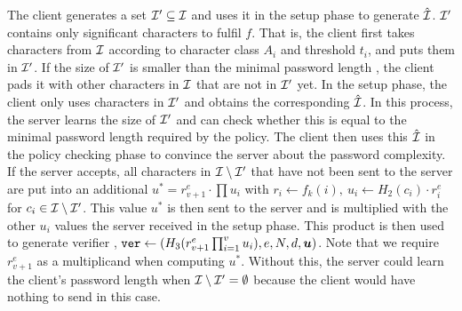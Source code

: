 The client generates a set $\mathcal{I}'\subseteq\mathcal{I}$ and uses it in the setup phase to generate $\hat{\mathcal{I}}$. 
$\mathcal{I}'$ contains only significant characters to fulfil $f$. 
That is, the client first takes characters from $\mathcal{I}$ according to character class $A_i$ and threshold $t_i$, and puts them in $\mathcal{I}'$.
If the size of $\mathcal{I}'$ is smaller than the minimal password length \pmin, the client pads it with other characters in $\mathcal{I}$ that are not in $\mathcal{I}'$ yet. 
In the setup phase, the client only uses characters in $\mathcal{I}'$ and obtains the corresponding $\hat{\mathcal{I}}$. In this process, the server learns the size of $\mathcal{I}'$ and can check whether this is equal to the minimal password length \pmin required by the policy. 
The client then uses this $\hat{\mathcal{I}}$ in the policy checking phase to convince the server about the password complexity. 
If the server accepts, all characters in $\mathcal{I}\setminus\mathcal{I}'$ that have not been sent to the server are put into an additional $u^\ast=r_{v+1}^e\cdot\prod u_i$ with $r_i\gets f_k(i),~ u_i\gets H_2(c_i)\cdot r_i^e$ for $c_i\in\mathcal{I}\setminus\mathcal{I}'$. 
This value $u^\ast$ is then sent to the server and is multiplied with the other $u_i$ values the server received in the setup phase.
This product is then used to generate verifier \ver, \ie $\mathtt{ver}\gets(H_3(r_{v+1}^e\prod_{i=1}^v u_i), e, N, d, \bm{u})$. 
Note that we require $r_{v+1}^e$ as a multiplicand when computing $u^\ast$. 
Without this, the server could learn the client's password length when $\mathcal{I}\setminus\mathcal{I}'=\emptyset$ because the client would have nothing to send in this case. 

